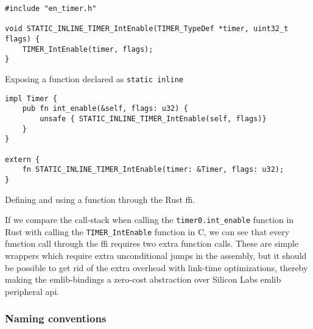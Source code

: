 \begin{listing}[tb]
\begin{verbatim}
#include "en_timer.h"

void STATIC_INLINE_TIMER_IntEnable(TIMER_TypeDef *timer, uint32_t flags) {
    TIMER_IntEnable(timer, flags);
}
\end{verbatim}
\caption{Exposing a function declared as \texttt{static inline}}
\label{lst:exposing_static_inline}
\end{listing}


\begin{listing}[tb]
\begin{verbatim}
impl Timer {
    pub fn int_enable(&self, flags: u32) {
        unsafe { STATIC_INLINE_TIMER_IntEnable(self, flags)}
    }
}

extern {
    fn STATIC_INLINE_TIMER_IntEnable(timer: &Timer, flags: u32);
}
\end{verbatim}
\caption{Defining and using a function through the Rust \gls{ffi}.}
\label{lst:rust_ffi_example}
\end{listing}

If we compare the call-stack when calling the \texttt{timer0.int\_enable} function in Rust with calling the \texttt{TIMER\_IntEnable} function in C, we can see that every function call through the \gls{ffi} requires two extra function calls.
These are simple wrappers which require extra unconditional jumps in the assembly, but it should be possible to get rid of the extra overhead with link-time optimizations, thereby making the emlib-bindings a zero-cost abstraction over Silicon Labs emlib peripheral \gls{api}.


\subsubsection{Naming conventions}

